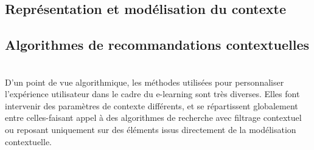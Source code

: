 \documentclass[conference]{./sty/IEEEtran}
\begin{document}
\subsection{Représentation et modélisation du contexte}

\subsection{Algorithmes de recommandations contextuelles}
~\\D'un point de vue algorithmique, les méthodes utilisées pour personnaliser l'expérience utilisateur dans le cadre du e-learning sont très diverses. Elles font intervenir des paramètres de contexte différents, et se répartissent globalement entre celles-faisant appel à des algorithmes de recherche avec filtrage contextuel ou reposant uniquement sur des éléments issus directement de la modélisation contextuelle.
\end{document}
